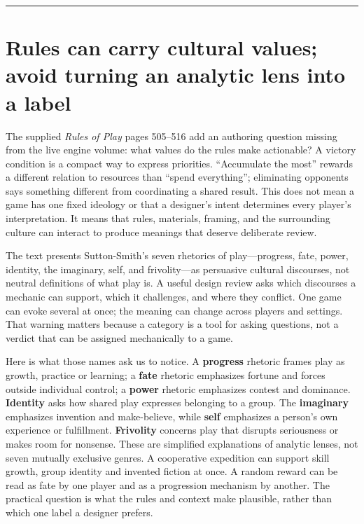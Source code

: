 \begin{center}\rule{0.5\linewidth}{0.5pt}\end{center}

\section{Rules can carry cultural values; avoid turning an analytic lens into a label}\label{06-engine-ii-ch046-rules-can-carry-cultural-values-avoid-turning-an-analytic-lens-into-a-label}

\hypertarget{06-engine-ii-ch046-rules-can-carry-cultural-values-avoid-turning-an-analytic-lens-into-a-label}{}

The supplied \emph{Rules of Play} pages 505--516 add an authoring question missing from the live engine volume: what values do the rules make actionable? A victory condition is a compact way to express priorities. ``Accumulate the most'' rewards a different relation to resources than ``spend everything''; eliminating opponents says something different from coordinating a shared result. This does not mean a game has one fixed ideology or that a designer's intent determines every player's interpretation. It means that rules, materials, framing, and the surrounding culture can interact to produce meanings that deserve deliberate review.

The text presents Sutton-Smith's seven rhetorics of play---progress, fate, power, identity, the imaginary, self, and frivolity---as persuasive cultural discourses, not neutral definitions of what play is. A useful design review asks which discourses a mechanic can support, which it challenges, and where they conflict. One game can evoke several at once; the meaning can change across players and settings. That warning matters because a category is a tool for asking questions, not a verdict that can be assigned mechanically to a game.

Here is what those names ask us to notice. A \textbf{progress} rhetoric frames play as growth, practice or learning; a \textbf{fate} rhetoric emphasizes fortune and forces outside individual control; a \textbf{power} rhetoric emphasizes contest and dominance. \textbf{Identity} asks how shared play expresses belonging to a group. The \textbf{imaginary} emphasizes invention and make-believe, while \textbf{self} emphasizes a person's own experience or fulfillment. \textbf{Frivolity} concerns play that disrupts seriousness or makes room for nonsense. These are simplified explanations of analytic lenses, not seven mutually exclusive genres. A cooperative expedition can support skill growth, group identity and invented fiction at once. A random reward can be read as fate by one player and as a progression mechanism by another. The practical question is what the rules and context make plausible, rather than which one label a designer prefers.

